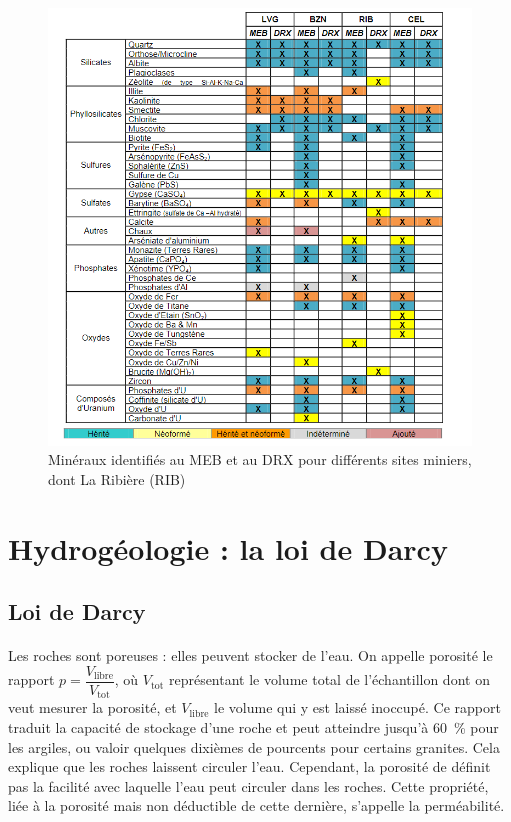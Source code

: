 \documentclass{article}
\begin{document}
\begin{figure}[H]
    \centering
    \includegraphics[width = \textwidth]{A_III_B_2_2.png}
    \caption{Minéraux identifiés au MEB et au DRX pour différents sites miniers, dont La Ribière (RIB) \cite{caracterisation_residus_2014}}
    \label{fig:rib_mineraux_presence}
\end{figure}


\newpage
\section{Hydrogéologie : la loi de Darcy}
\subsection{Loi de Darcy}

\paragraph{} Les roches sont poreuses : elles peuvent stocker de l’eau. On appelle porosité le rapport $p=\dfrac{V_{\text{libre}}}{V_{\text{tot}}}$, où $V_{\text{tot}}$ représentant le volume total de l'échantillon dont on veut mesurer la porosité, et $V_{\text{libre}}$ le volume qui y est laissé inoccupé. Ce rapport traduit la capacité de stockage d'une roche et peut atteindre jusqu’à 60~\% pour les argiles, ou valoir quelques dixièmes de pourcents pour certains granites. Cela explique que les roches laissent circuler l’eau. Cependant, la porosité de définit pas la facilité avec laquelle l’eau peut circuler dans les roches. Cette propriété, liée à la porosité mais non déductible de cette dernière, s’appelle la perméabilité.
\end{document}
